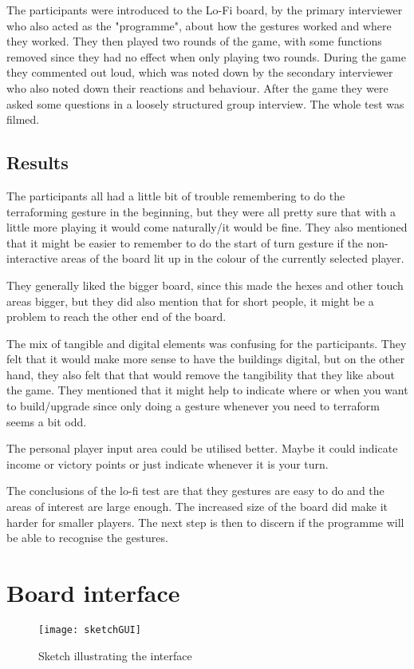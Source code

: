 The participants were introduced to the Lo-Fi board, by the primary interviewer who also acted as the "programme", about how the gestures worked and where they worked. They then played two rounds of the game, with some functions removed since they had no effect when only playing two rounds. During the game they commented out loud, which was noted down by the secondary interviewer who also noted down their reactions and behaviour. 
After the game they were asked some questions in a loosely structured group interview. 
The whole test was filmed.

\subsection{Results} 
The participants all had a little bit of trouble remembering to do the terraforming gesture in the beginning, but they were all pretty sure that with a little more playing it would come naturally/it would be fine. They also mentioned that it might be easier to remember to do the start of turn gesture if the non-interactive areas of the board lit up in the colour of the currently selected player. 

They generally liked the bigger board, since this made the hexes and other touch areas bigger, but they did also mention that for short people, it might be a problem to reach the other end of the board. 

The mix of tangible and digital elements was confusing for the participants. They felt that it would make more sense to have the buildings digital, but on the other hand, they also felt that that would remove the tangibility that they like about the game. They mentioned that it might help to indicate where or when you want to build/upgrade since only doing a gesture whenever you need to terraform seems a bit odd. 

The personal player input area could be utilised better. Maybe it could indicate income or victory points or just indicate whenever it is your turn. 

The conclusions of the lo-fi test are that they gestures are easy to do and the areas of interest are large enough. The increased size of the board did make it harder for smaller players. The next step is then to discern if the programme will be able to recognise the gestures. 

\section{Board interface}
\begin{figure}
\centering
\texttt{[image: sketchGUI]}
\caption{Sketch illustrating the interface}
\label{fig:sketchGUI}
\end{figure}

